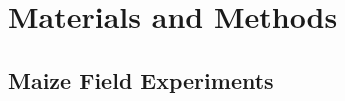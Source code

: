 \documentclass[12pt,twoside]{gsag3jnl}
\begin{document}

\section{Materials and Methods}
\label{sec:materials:methods}

\subsection{Maize Field Experiments}
\end{document}

